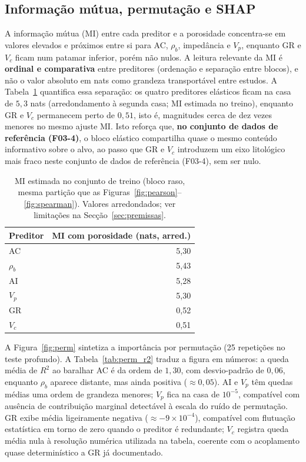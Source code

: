 \documentclass[12pt,a4paper]{article}
\newcommand{\dadosref}{conjunto de dados de referência (F03-4)}
\begin{document}
\subsection{Informação mútua, permutação e SHAP}
A informação mútua (MI) entre cada preditor e a porosidade concentra-se em valores
elevados e próximos entre si para AC, \(\rho_b\), impedância e \(V_p\),
enquanto GR e \(V_c\) ficam num patamar inferior, porém não nulos. A leitura
relevante da MI é \textbf{ordinal e comparativa} entre preditores (ordenação e
separação entre blocos), e não o valor absoluto em nats como grandeza
transportável entre estudos. A Tabela~\ref{tab:mi_por} quantifica essa separação:
os quatro preditores elásticos
ficam na casa de \(5{,}3\) nats (arredondamento à segunda casa; MI estimada no treino), enquanto GR e
\(V_c\) permanecem perto de \(0{,}51\), isto é, magnitudes cerca de dez vezes
menores no mesmo ajuste MI. Isto reforça que, \textbf{no \dadosref}, o
bloco elástico compartilha quase o mesmo conteúdo informativo sobre o alvo, ao
passo que GR e \(V_c\) introduzem um eixo litológico mais fraco neste \dadosref, sem
ser nulo.

\begin{table}[h]
\centering
\begin{tabular}{lr}
\toprule
Preditor & MI com porosidade (nats, arred.) \\
\midrule
AC & 5{,}30 \\
\(\rho_b\) & 5{,}43 \\
AI & 5{,}28 \\
\(V_p\) & 5{,}30 \\
GR & 0{,}52 \\
\(V_c\) & 0{,}51 \\
\bottomrule
\end{tabular}
\caption{MI estimada no conjunto de treino (bloco raso, mesma partição que as
Figuras~\ref{fig:pearson}--\ref{fig:spearman}). Valores arredondados; ver limitações na
Secção~\ref{sec:premissas}.}
\label{tab:mi_por}
\end{table}

A Figura~\ref{fig:perm} sintetiza a importância por permutação (25 repetições
no teste profundo). A Tabela~\ref{tab:perm_r2} traduz a figura em números: a queda
média de \(R^2\) ao baralhar AC é da ordem de \(1{,}30\), com desvio-padrão de
\(0{,}06\), enquanto \(\rho_b\) aparece distante, mas ainda positiva (\(\approx 0{,}05\)).
AI e \(V_p\) têm quedas médias uma ordem de grandeza menores; \(V_p\) fica na casa
de \(10^{-5}\), compatível com ausência de contribuição marginal detectável
à escala do ruído de permutação. GR exibe média ligeiramente negativa
(\(\approx -9\times 10^{-4}\)), compatível com flutuação estatística em torno
de zero quando o preditor é redundante; \(V_c\) registra queda média nula à
resolução numérica utilizada na tabela, coerente com o acoplamento quase determinístico a GR já
documentado.
\end{document}
